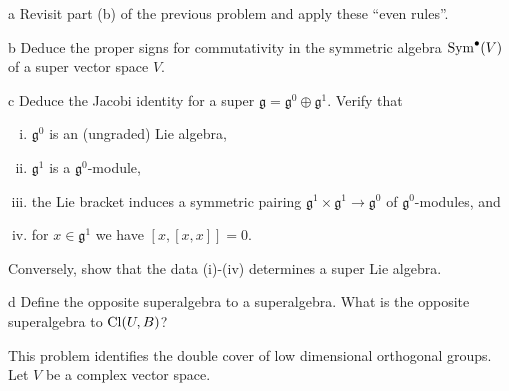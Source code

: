 \documentclass{pset}
\begin{document}
\begin{parts}
  \begin{part}{a}
    Revisit part (b) of the previous problem and apply these ``even rules''.
  \end{part}

  \begin{part}{b}
    Deduce the proper signs for commutativity in the symmetric algebra $\mathrm{Sym}^\bullet(V)$ of a super vector space $V$.
  \end{part}

  \begin{part}{c}
    Deduce the Jacobi identity for a super $\mathfrak{g} = \mathfrak{g}^0\oplus \mathfrak{g}^1$. Verify that
    \begin{enumerate}[(i)]
      \item $\mathfrak{g}^0$ is an (ungraded) Lie algebra,
      \item $\mathfrak{g}^1$ is a $\mathfrak{g}^0$-module,
      \item the Lie bracket induces a symmetric pairing $\mathfrak{g}^1\times \mathfrak{g}^1 \to \mathfrak{g}^0$ of $\mathfrak{g}^0$-modules, and
      \item for $x\in \mathfrak{g}^1$ we have $[x,[x,x]] = 0$.
    \end{enumerate}
    Conversely, show that the data (i)-(iv) determines a super Lie algebra.
  \end{part}

  \begin{part}{d}
    Define the opposite superalgebra to a superalgebra. What is the opposite superalgebra to $\mathrm{Cl}(U, B)$?
  \end{part}
\end{parts}

\begin{problem}{4}
  This problem identifies the double cover of low dimensional orthogonal groups. Let $V$ be a complex vector space.
\end{problem}
\end{document}
